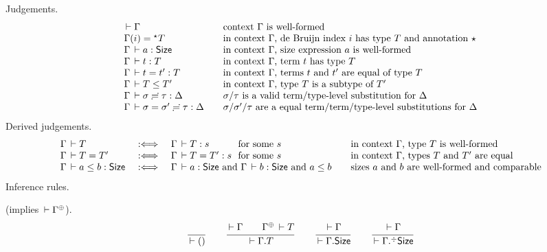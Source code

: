 \documentclass[acmlarge,review,anonymous]{acmart}\settopmatter{printfolios=true}
\begin{document}
Judgements.
\[
\begin{array}{l@{\qquad}l}
  \der \Gamma & \mbox{context $\Gamma$ is well-formed} \\
  \Gamma(i) = \eann T & \mbox{in context $\Gamma$, de Bruijn index $i$ has type $T$ and annotation $\evar$} \\
  \Gamma \der a : \Size & \mbox{in context $\Gamma$, size expression $a$ is well-formed} \\
  \Gamma \der t : T & \mbox{in context $\Gamma$, term $t$ has type $T$} \\
  \Gamma \der t = t' : T & \mbox{in context $\Gamma$, terms $t$ and $t'$ are equal of type $T$} \\
  \Gamma \der T \leq T' & \mbox{in context $\Gamma$, type $T$ is a subtype of $T'$} \\
  \suty \Gamma \sigma \tau \Delta & \mbox{$\sigma$/$\tau$ is a valid term/type-level substitution for $\Delta$} \\
  \sueq \Gamma \sigma {\sigma'} \tau \Delta & \mbox{$\sigma$/$\sigma'$/$\tau$ are a equal term/term/type-level substitutions for $\Delta$} \\
\end{array}
\]
Derived judgements.
\[
\begin{array}{lll@{~}l@{\qquad}l}
  \Gamma \der T & \defas & \Gamma \der T : s & \mforsome s
    & \mbox{in context $\Gamma$, type $T$ is well-formed} \\
  \Gamma \der T = T' & \defas & \Gamma \der T = T' : s & \mforsome s
    & \mbox{in context $\Gamma$, types $T$ and $T'$ are equal} \\
  \Gamma \der a \leq b : \Size & \defas & \multicolumn 2 {l@{\qquad}} {\Gamma \der a : \Size \mand \Gamma \der b : \Size \mand a \leq b}
    & \mbox{sizes $a$ and $b$ are well-formed and comparable} \\
\end{array}
\]
Inference rules.

\fbox{$\der \Gamma$} (implies $\der \resurrect \Gamma$).
\[
  \ru{}{\der \cempty}
\qquad
  \ru{\der \Gamma \qquad
      \resurrect \Gamma \der T
    }{\der \cext \Gamma T}
\qquad
  \ru{\der \Gamma
    }{\der \cext \Gamma \Size}
\qquad
  \ru{\der \Gamma
    }{\der \erext \Gamma \Size}
\]
\end{document}
